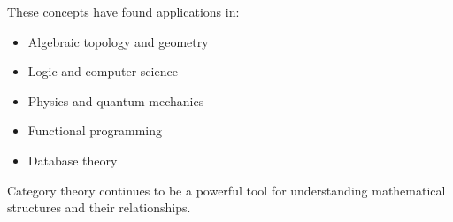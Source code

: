 \documentclass[11pt]{article}
\theoremstyle{definition}
\begin{document}
These concepts have found applications in:
\begin{itemize}
    \item Algebraic topology and geometry
    \item Logic and computer science
    \item Physics and quantum mechanics
    \item Functional programming
    \item Database theory
\end{itemize}

Category theory continues to be a powerful tool for understanding mathematical structures and their relationships.
\end{document}
